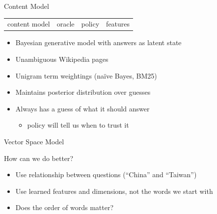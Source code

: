 \documentclass[compress]{beamer}
\newcommand{\gfxq}[2]{
\begin{center}
	\texttt{[image: qb/\#1]}
\end{center}
}
\begin{document}
\begin{frame}{Content Model}

\begin{block}{}
  \begin{center}
    \vspace{-.5cm}
    \begin{tabular}{cccc}
      \alert{content model} & oracle & policy & features \\
    \end{tabular}
    \vspace{-.5cm}
  \end{center}
\end{block}


  \begin{itemize}
   \item Bayesian generative model with answers as latent state
         \item Unambiguous Wikipedia pages
           \item Unigram term weightings (na\"ive Bayes, BM25)
    \item Maintains posterior distribution over guesses
    \item Always has a guess of what it should answer
      \begin{itemize}
        \item policy will tell us when to trust it
       \end{itemize}

  \end{itemize}
\end{frame}

\begin{frame}{Vector Space Model}

  \only<1>{\gfxq{unigram_models_0}{.8}}
  \only<2>{\gfxq{unigram_models_1}{.8}}
  \only<3>{\gfxq{unigram_models_2}{.8}}
  \only<4>{\gfxq{unigram_models_3}{.8}}
  \only<5>{\gfxq{unigram_models_4}{.8}}
  \only<6>{\gfxq{unigram_models_5}{.8}}
  \only<7>{\gfxq{unigram_models_6}{.8}}
  \only<8>{\gfxq{unigram_models_7}{.8}}
  \only<9>{\gfxq{unigram_models_8}{.8}}


\end{frame}



\begin{frame}{How can we do better?}

  \begin{itemize}
    \item Use relationship between questions (``China'' and
      ``Taiwan'')
    \item Use learned features and dimensions, not the words we start with
    \item Does the order of words matter?
  \end{itemize}

\end{frame}
\end{document}
